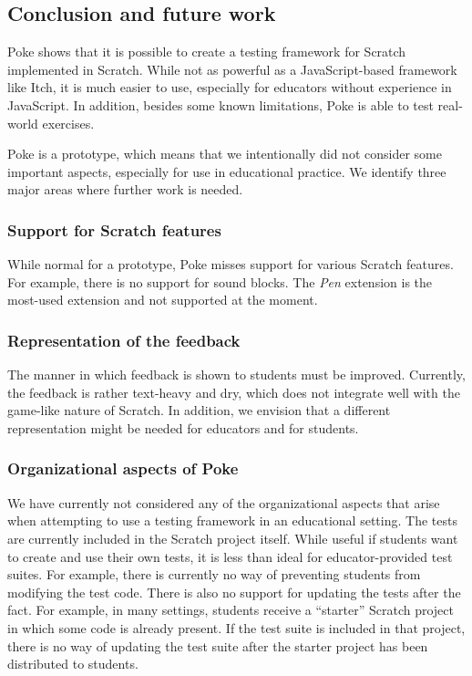 \documentclass[../main]{subfiles}
\begin{document}
\subsection{Conclusion and future work}\label{subsec:conclusion-and-future-work}

Poke shows that it is possible to create a testing framework for Scratch implemented in Scratch.
While not as powerful as a JavaScript-based framework like Itch, it is much easier to use, especially for educators without experience in JavaScript.
In addition, besides some known limitations, Poke is able to test real-world exercises.

Poke is a prototype, which means that we intentionally did not consider some important aspects, especially for use in educational practice.
We identify three major areas where further work is needed.

\subsubsection{Support for Scratch features}
While normal for a prototype, Poke misses support for various Scratch features.
For example, there is no support for sound blocks.
The \textit{Pen} extension is the most-used extension and not supported at the moment.

\subsubsection{Representation of the feedback}
The manner in which feedback is shown to students must be improved.
Currently, the feedback is rather text-heavy and dry, which does not integrate well with the game-like nature of Scratch.
In addition, we envision that a different representation might be needed for educators and for students.

\subsubsection{Organizational aspects of Poke}
We have currently not considered any of the organizational aspects that arise when attempting to use a testing framework in an educational setting.
The tests are currently included in the Scratch project itself.
While useful if students want to create and use their own tests, it is less than ideal for educator-provided test suites.
For example, there is currently no way of preventing students from modifying the test code.
There is also no support for updating the tests after the fact.
For example, in many settings, students receive a ``starter'' Scratch project in which some code is already present.
If the test suite is included in that project, there is no way of updating the test suite after the starter project has been distributed to students.
\end{document}
